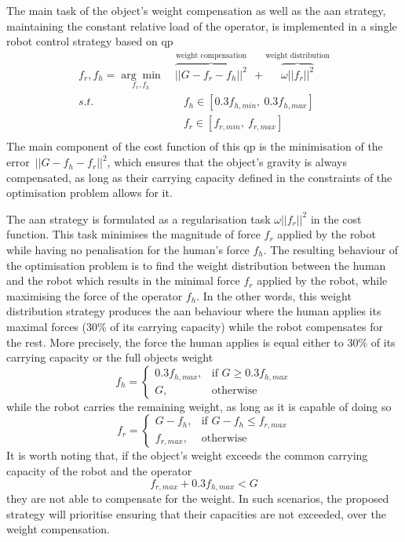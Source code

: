 The main task of the object's weight compensation as well as the \gls{aan} strategy, maintaining the constant relative load of the operator, is implemented in a single robot control strategy based on \gls{qp}
\begin{equation}
\begin{split}
    f_r,f_h =\underset{f_r,f_h}{\arg\min} &~\overbrace{||G- f_r -f_h||^2}^{\text{weight compensation}} ~~+ \overbrace{\omega||f_r||^2}^{\text{weight distribution}}\\
    s.t.& \quad f_h \in[0.3f_{h,min}, ~0.3f_{h,max}]\\
    & \quad f_r \in[f_{r,min}, ~f_{r,max}]\\
\end{split}
\label{eq:qp_human_robot}
\end{equation}
The main component of the cost function of this \gls{qp} is the minimisation of the error~${||G\! -\! f_{h}\! -\!f_{r}||^2}$, which ensures that the object's gravity is always compensated, as long as their carrying capacity defined in the constraints of the optimisation problem allows for it. 

The \gls{aan} strategy is formulated as a regularisation task $\omega||f_r||^2$ in the cost function. This task minimises the magnitude of force $f_{r}$ applied by the robot while having no penalisation for the human's force $f_h$. The resulting behaviour of the optimisation problem is to find the weight distribution between the human and the robot which results in the minimal force $f_{r}$ applied by the robot, while maximising the force of the operator $f_h$. In the other words, this weight distribution strategy produces the \gls{aan} behaviour where the human applies its maximal forces (30\% of its carrying capacity) while the robot compensates for the rest. More precisely, the force the human applies is equal either to 30\% of its carrying capacity or the full objects weight
$$
f_h = \begin{cases}
    0.3f_{h,max},& \text{if } G\geq 0.3f_{h,max}\\
    G,              & \text{otherwise}
\end{cases}
$$
while the robot carries the remaining weight, as long as it is capable of doing so
$$
f_r =  \begin{cases}
    G-f_h,& \text{if } G-f_h\leq f_{r,max}\\
    f_{r,max},              & \text{otherwise}
\end{cases}
$$
It is worth noting that, if the object's weight exceeds the common carrying capacity of the robot and the operator $$f_{r,max} + 0.3f_{h,max} < G$$
they are not able to compensate for the weight. In such scenarios, the proposed strategy will prioritise ensuring that their capacities are not exceeded, over the weight compensation.

